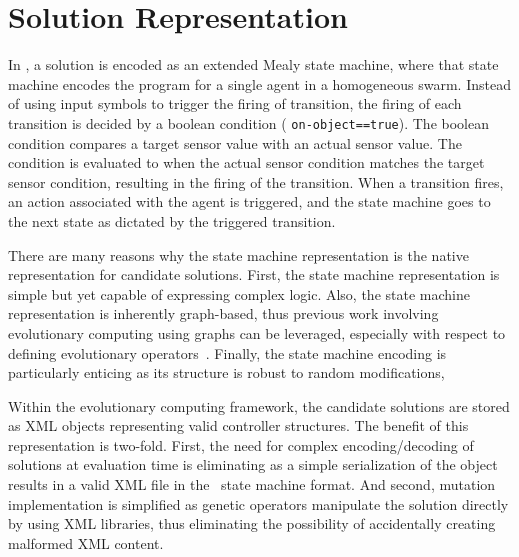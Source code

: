 \section{Solution Representation}
\label{sec:solution-representation}

In \ECS, a solution is encoded as an extended Mealy state machine, where that state machine encodes the program for a single agent in a homogeneous swarm.  Instead of using input symbols to trigger the firing of transition, the firing of each transition is decided by a boolean condition (\eg{} \texttt{on-object==true}).  The boolean condition compares a target sensor value with an actual sensor value.  The condition is evaluated to \true{} when the actual sensor condition matches the target sensor condition, resulting in the firing of the transition.  When a transition fires, an action associated with the agent is triggered, and the state machine goes to the next state as dictated by the triggered transition.  

There are many reasons why the state machine representation is the native representation for candidate solutions.  First, the state machine representation is simple but yet capable of expressing complex logic.  Also, the state machine representation is inherently graph-based, thus previous work involving evolutionary computing using graphs can be leveraged, especially with respect to defining evolutionary operators~\cite{back:ec1}.  Finally, the state machine encoding is particularly enticing as its structure is robust to random modifications, %

Within the evolutionary computing framework, the candidate solutions are stored as XML objects  representing valid \SWEEP{} controller structures.  The benefit of this representation is two-fold.  First, the need for complex encoding/decoding of solutions at evaluation time is eliminating as a simple serialization of the object results in a valid XML file in the \SWEEP\ state machine format.  And second, mutation implementation is simplified as genetic operators manipulate the solution directly by using XML libraries, thus eliminating the possibility of accidentally creating malformed XML content.  

